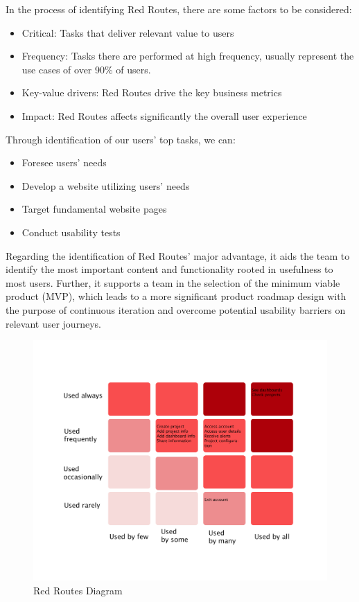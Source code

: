 \documentclass[a4paper,twoside,10pt]{report}
\begin{document}
In the process of identifying Red Routes, there are some factors to be considered:
\begin{itemize}
	\item  Critical: Tasks that deliver relevant value to users
 	\item Frequency: Tasks there are performed at high frequency, usually represent the use cases of over 90\% of users.
 	\item Key-value drivers: Red Routes drive the key business metrics
 	\item  Impact: Red Routes affects significantly the overall user experience
\end{itemize}
Through identification of our users' top tasks, we can:
\begin{itemize}
	\item Foresee users' needs
	\item Develop a website utilizing users' needs
	\item Target fundamental website pages
	\item Conduct usability tests
\end{itemize}	
Regarding the identification of Red Routes' major advantage, it aids the team to identify the most important content and functionality rooted in usefulness to most users.  Further, it supports a team in the selection of the minimum viable product (MVP), which leads to a more significant product roadmap design with the purpose of continuous iteration and overcome potential usability barriers on relevant user journeys. 
\begin{figure}[h!]
\center
    \includegraphics[width=\textwidth]{red-routes.png}
\caption{Red Routes Diagram}
\end{figure}
\end{document}
